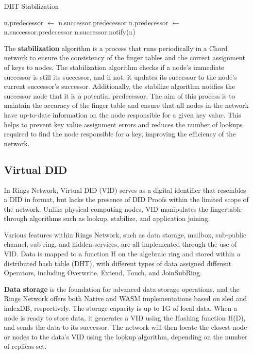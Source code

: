 \documentclass[twocolumn]{article}
\begin{document}
\begin{algorithm}[h]
\caption{DHT Stabilization}
\begin{algorithmic}[1]
\State n.predecessor $\gets$ n.successor.predecessor
\If {$hash(n.predecessor) \in (hash(n), hash(n.successor)]$}
\State n.predecessor $\gets$ n.successor.predecessor
\EndIf
\State n.successor.notify(n)
\EndProcedure
\end{algorithmic}
\end{algorithm}

The \textbf{stabilization} algorithm is a process that runs periodically in a Chord network to ensure the consistency of the finger tables and the correct assignment of keys to nodes. The stabilization algorithm checks if a node's immediate successor is still its successor, and if not, it updates its successor to the node's current successor's successor. Additionally, the stabilize algorithm notifies the successor node that it is a potential predecessor. The aim of this process is to maintain the accuracy of the finger table and ensure that all nodes in the network have up-to-date information on the node responsible for a given key value. This helps to prevent key value assignment errors and reduces the number of lookups required to find the node responsible for a key, improving the efficiency of the network.

\subsection{Virtual DID}

In Rings Network, Virtual DID (VID) serves as a digital identifier that resembles a DID in format, but lacks the presence of DID Proofs within the limited scope of the network. Unlike physical computing nodes, VID manipulates the fingertable through algorithms such as lookup, stabilize, and application joining.

Various features within Rings Network, such as data storage, mailbox, sub-public channel, sub-ring, and hidden services, are all implemented through the use of VID. Data is mapped to a function H on the algebraic ring and stored within a distributed hash table (DHT), with different types of data assigned different Operators, including Overwrite, Extend, Touch, and JoinSubRing.

\textbf{Data storage} is the foundation for advanced data storage operations, and the Rings Network offers both Native and WASM implementations based on sled and indexDB, respectively. The storage capacity is up to 1G of local data. When a node is ready to store data, it generates a VID using the Hashing function H(D), and sends the data to its successor. The network will then locate the closest node or nodes to the data's VID using the lookup algorithm, depending on the number of replicas set.
\end{document}
